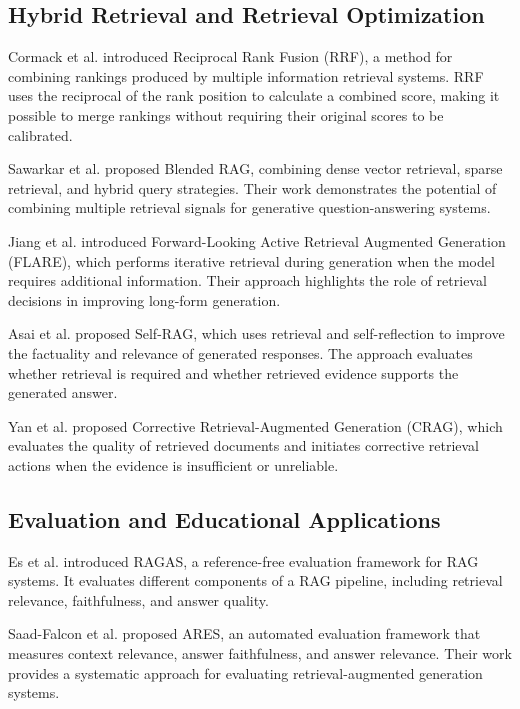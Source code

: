\documentclass[conference]{IEEEtran}
\begin{document}
\subsection{Hybrid Retrieval and Retrieval Optimization}

Cormack et al. \cite{Cormack2009} introduced Reciprocal
Rank Fusion (RRF), a method for combining rankings
produced by multiple information retrieval systems.
RRF uses the reciprocal of the rank position to
calculate a combined score, making it possible to
merge rankings without requiring their original
scores to be calibrated.

Sawarkar et al. \cite{BlendedRAG2024} proposed
Blended RAG, combining dense vector retrieval,
sparse retrieval, and hybrid query strategies.
Their work demonstrates the potential of combining
multiple retrieval signals for generative
question-answering systems.

Jiang et al. \cite{FLARE2023} introduced Forward-Looking
Active Retrieval Augmented Generation (FLARE), which
performs iterative retrieval during generation when
the model requires additional information. Their
approach highlights the role of retrieval decisions
in improving long-form generation.

Asai et al. \cite{SelfRAG2024} proposed Self-RAG,
which uses retrieval and self-reflection to improve
the factuality and relevance of generated responses.
The approach evaluates whether retrieval is required
and whether retrieved evidence supports the generated
answer.

Yan et al. \cite{CRAG2024} proposed Corrective
Retrieval-Augmented Generation (CRAG), which evaluates
the quality of retrieved documents and initiates
corrective retrieval actions when the evidence is
insufficient or unreliable.

\subsection{Evaluation and Educational Applications}

Es et al. \cite{RAGAS2023} introduced RAGAS, a
reference-free evaluation framework for RAG systems.
It evaluates different components of a RAG pipeline,
including retrieval relevance, faithfulness, and
answer quality.

Saad-Falcon et al. \cite{ARES2024} proposed ARES,
an automated evaluation framework that measures
context relevance, answer faithfulness, and answer
relevance. Their work provides a systematic approach
for evaluating retrieval-augmented generation systems.
\end{document}
